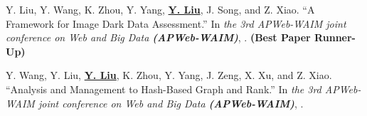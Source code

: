 \documentclass[a4paper,10pt,oneside]{article}
\begin{document}
\begin{body}

\NumberedItem{[6]}
Y. Liu, Y. Wang, K. Zhou, Y. Yang, \textbf{\underline{Y. Liu}}, J. Song, and Z. Xiao.
``A Framework for Image Dark Data Assessment.''
In \textit{the 3rd APWeb-WAIM joint conference on Web and Big Data \textbf{(APWeb-WAIM)}}, %
. \textbf{(Best Paper Runner-Up)}


\NumberedItem{[7]}
Y. Wang, Y. Liu, \textbf{\underline{Y. Liu}}, K. Zhou, Y. Yang, J. Zeng, X. Xu, and Z. Xiao.
``Analysis and Management to Hash-Based Graph and Rank.''
In \textit{the 3rd APWeb-WAIM joint conference on Web and Big Data \textbf{(APWeb-WAIM)}}, %
. 










\end{body}
\end{document}
